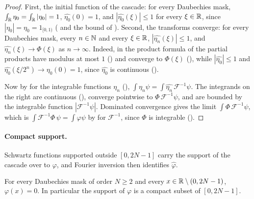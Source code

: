 \begin{proof}
\leanok
{}
First, the initial function of the cascade: for every Daubechies mask,
$\int_{\mathbb{R}} \eta_0 = \int_{\mathbb{R}} |\eta_0| = 1$, $\widehat{\eta_0}(0) = 1$, and
$|\widehat{\eta_0}(\xi)| \leq 1$ for every $\xi \in \mathbb{R}$, since $|\eta_0| = \eta_0 = 1_{[0, 1)}$
( and the bound of ). Second, the
transforms converge: for every Daubechies mask, every $n \in \mathbb{N}$ and every $\xi \in \mathbb{R}$,
$|\widehat{\eta_n}(\xi)| \leq 1$, and $\widehat{\eta_n}(\xi) \to \Phi(\xi)$ as $n \to \infty$.
Indeed, in the product formula of  the partial products have
modulus at most $1$ () and converge to $\Phi(\xi)$
(), while $|\widehat{\eta_0}| \leq 1$ and
$\widehat{\eta_0}(\xi/2^n) \to \widehat{\eta_0}(0) = 1$, since $\widehat{\eta_0}$ is continuous
().

Now by  for the integrable functions $\eta_n$
(),
$\int \eta_n \psi = \int \widehat{\eta_n} \, \mathcal F^{-1} \psi$. The integrands on the right
are continuous (), converge pointwise to
$\Phi \, \mathcal F^{-1} \psi$, and are bounded by the integrable function
$|\mathcal F^{-1} \psi|$. Dominated convergence gives the limit
$\int \Phi \, \mathcal F^{-1} \psi$, which is
$\int \mathcal F^{-1} \Phi \, \psi = \int \varphi \psi$ by 
for $\mathcal F^{-1}$, since $\Phi$ is integrable ().
\end{proof}

\paragraph{Compact support.}
Schwartz functions supported outside $[0, 2N - 1]$ carry the support of the cascade over to
$\varphi$, and Fourier inversion then identifies $\widehat\varphi$.

\begin{theorem}
\label{thm:daub-scaling-support}
\leanok
{}
For every Daubechies mask of order $N \geq 2$ and every $x \in \mathbb{R} \setminus (0, 2N - 1)$,
$\varphi(x) = 0$. In particular the support of $\varphi$ is a compact subset of $[0, 2N - 1]$.
\end{theorem}

